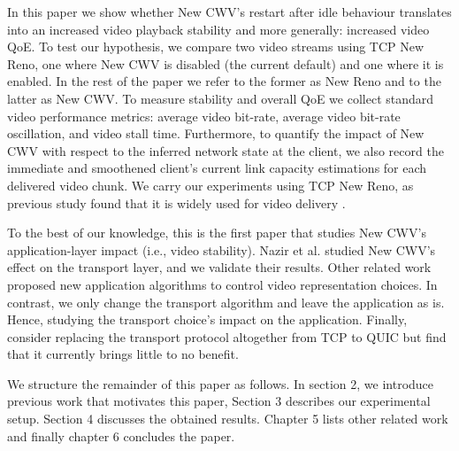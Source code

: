\documentclass[10pt,sigconf]{acmart}
\begin{document}
In this paper we show whether New CWV's restart after idle behaviour translates into an increased video playback stability and more generally: increased video QoE. To test our hypothesis, we compare two video streams using TCP New Reno, one where New CWV is disabled (the current default) and one where it is enabled. In the rest of the paper we refer to the former as New Reno and to the latter as New CWV. To measure stability and overall QoE we collect standard video performance metrics: average video bit-rate, average video bit-rate oscillation, and video stall time. Furthermore, to quantify the impact of New CWV with respect to the inferred network state at the client, we also record the immediate and smoothened client's current link capacity estimations for each delivered video chunk. We carry our experiments using TCP New Reno, as previous study found that it is widely used for video delivery \cite{Mishra-2019-the-great-internet-tcp-congestion-control-census}.


To the best of our knowledge, this is the first paper that studies New CWV's application-layer impact (i.e., video stability). Nazir et al. \cite{Nazir-2014-performance-evaluation-congestion-window-validation-dash-newcwv} studied New CWV's effect on the transport layer, and we validate their results. Other related work proposed new application algorithms to control video representation choices\cite{Mok-2012-qdash,Huang-2015-A-buffer-based-approach-to-rate-adaptation-bba, Yin-2015-a-control-theoritic-approach}. In contrast, we only change the transport algorithm and leave the application as is. Hence, studying the transport choice's impact on the application. Finally, \cite{Bhat-2017-not-so-quic} consider replacing the transport protocol altogether from TCP to QUIC but find that it currently brings little to no benefit. 


We structure the remainder of this paper as follows. In section 2, we introduce previous work that motivates this paper, Section 3 describes our experimental setup. Section 4 discusses the obtained results. Chapter 5 lists other related work and finally chapter 6 concludes the paper.
\end{document}
